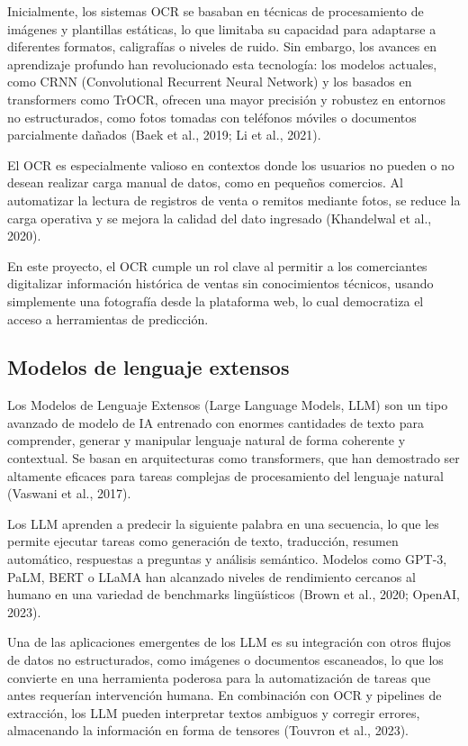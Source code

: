 \indent Inicialmente, los sistemas OCR se basaban en técnicas de procesamiento de imágenes y plantillas estáticas, lo que limitaba su capacidad para adaptarse a diferentes formatos, caligrafías o niveles de ruido. Sin embargo, los avances en aprendizaje profundo han revolucionado esta tecnología: los modelos actuales, como CRNN (Convolutional Recurrent Neural Network) y los basados en transformers como TrOCR, ofrecen una mayor precisión y robustez en entornos no estructurados, como fotos tomadas con teléfonos móviles o documentos parcialmente dañados (Baek et al., 2019; Li et al., 2021).

\indent El OCR es especialmente valioso en contextos donde los usuarios no pueden o no desean realizar carga manual de datos, como en pequeños comercios. Al automatizar la lectura de registros de venta o remitos mediante fotos, se reduce la carga operativa y se mejora la calidad del dato ingresado (Khandelwal et al., 2020).

\indent En este proyecto, el OCR cumple un rol clave al permitir a los comerciantes digitalizar información histórica de ventas sin conocimientos técnicos, usando simplemente una fotografía desde la plataforma web, lo cual democratiza el acceso a herramientas de predicción.


\subsection{Modelos de lenguaje extensos}

\indent Los Modelos de Lenguaje Extensos (Large Language Models, LLM) son un tipo avanzado de modelo de IA entrenado con enormes cantidades de texto para comprender, generar y manipular lenguaje natural de forma coherente y contextual. Se basan en arquitecturas como transformers, que han demostrado ser altamente eficaces para tareas complejas de procesamiento del lenguaje natural (Vaswani et al., 2017).

\indent Los LLM aprenden a predecir la siguiente palabra en una secuencia, lo que les permite ejecutar tareas como generación de texto, traducción, resumen automático, respuestas a preguntas y análisis semántico. Modelos como GPT-3, PaLM, BERT o LLaMA han alcanzado niveles de rendimiento cercanos al humano en una variedad de benchmarks lingüísticos (Brown et al., 2020; OpenAI, 2023).

\indent Una de las aplicaciones emergentes de los LLM es su integración con otros flujos de datos no estructurados, como imágenes o documentos escaneados, lo que los convierte en una herramienta poderosa para la automatización de tareas que antes requerían intervención humana. En combinación con OCR y pipelines de extracción, los LLM pueden interpretar textos ambiguos y corregir errores, almacenando la información en forma de tensores (Touvron et al., 2023).

